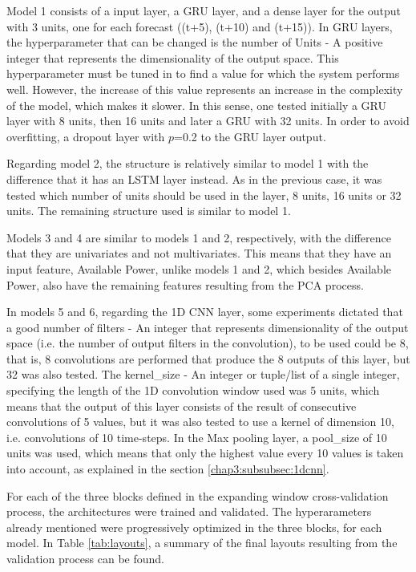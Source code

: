 Model 1 consists of a input layer, a \ac{GRU} layer, and a dense layer for the output with 3 units, one for each forecast ((t+5), (t+10) and (t+15)). In \ac{GRU} layers, the hyperparameter that can be changed is the number of Units - A positive integer that represents the dimensionality of the output space. This hyperparameter must be tuned in to find a value for which the system performs well. However, the increase of this value represents an increase in the complexity of the model, which makes it slower. In this sense, one tested initially a \ac{GRU} layer with 8 units, then 16 units and later a \ac{GRU} with 32 units. In order to avoid overfitting, a dropout layer with $p$=0.2 to the \ac{GRU} layer output.

Regarding model 2, the structure is relatively similar to model 1 with the difference that it has an \ac{LSTM} layer instead. As in the previous case, it was tested which number of units should be used in the layer, 8 units, 16 units or 32 units. The remaining structure used is similar to model 1.

Models 3 and 4 are similar to models 1 and 2, respectively, with the difference that they are univariates and not multivariates. This means that they have an input feature, Available Power, unlike models 1 and 2, which besides Available Power, also have the remaining features resulting from the \ac{PCA} process.

In models 5 and 6, regarding the \ac{1D CNN} layer, some experiments dictated that a good number of filters - An integer that represents dimensionality of the output space (i.e. the number of output filters in the convolution), to be used could be 8, that is, 8 convolutions are performed that produce the 8 outputs of this layer, but 32 was also tested. The kernel\_size - An integer or tuple/list of a single integer, specifying the length of the 1D convolution window used was 5 units, which means that the output of this layer consists of the result of consecutive convolutions of 5 values, but it was also tested to use a kernel of dimension 10, i.e. convolutions of 10 time-steps. In the Max pooling layer, a pool\_size of 10 units was used, which means that only the highest value every 10 values is taken into account, as explained in the section \ref{chap3:subsubsec:1dcnn}. 


For each of the three blocks defined in the expanding window cross-validation process, the architectures were trained and validated. The hyperarameters already mentioned were progressively optimized in the three blocks, for each model. In Table \ref{tab:layouts}, a summary of the final layouts resulting from the validation process can be found.

